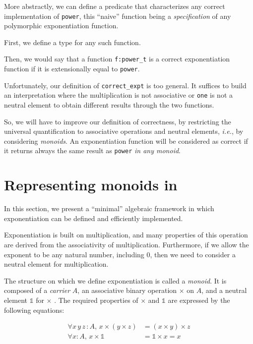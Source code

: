 More abstractly, we can define a predicate that characterizes any correct implementation 
of \texttt{power}, this ``naive''  function being a \emph{specification} of any polymorphic
exponentiation function.

First, we define a type for any such function.


Then, we would say that a function \texttt{f:power\_t} is a correct exponentiation function if it
is extensionally equal to \texttt{power}.


Unfortunately, our definition of \texttt{correct\_expt} is too general. It suffices to build 
an interpretation where the multiplication is not associative or \texttt{one} is not a neutral
element to obtain different results through the two functions.




So, we will have to improve our definition of correctness, by restricting  the universal quantification to associative operations and neutral elements, \emph{i.e.}, by considering \emph{monoids}.
An exponentiation  function will be considered as correct if it returns always the same result as \texttt{power} \emph{in any monoid}.



\section{Representing monoids in \coq \label{monoid-class-def}}

In this section, we present a ``minimal'' algebraic framework in which  exponentiation can be defined and efficiently implemented.

Exponentiation is built on multiplication, and many properties of 
this operation are derived from the associativity of multiplication. 
Furthermore, if we allow the exponent to be any natural number, including $0$, 
then we need to consider a neutral element for multiplication.

The structure on which we define exponentiation is called a \emph{monoid}.
It is composed of a \emph{carrier} $A$, an associative binary operation $\times$ on $A$, and a neutral element $\mathds{1}$ for $\times$ . The required properties of $\times$ and
$\mathds{1}$ are expressed by the following equations:


\begin{align}
  \label{eq}
  \forall x\,y\,z\,:A,\, x\times (y \times z) &= (x\times y) \times z
  \\
\forall x:A,\, x \times \mathds{1}  &= \mathds{1}  \times x = x
\end{align}


